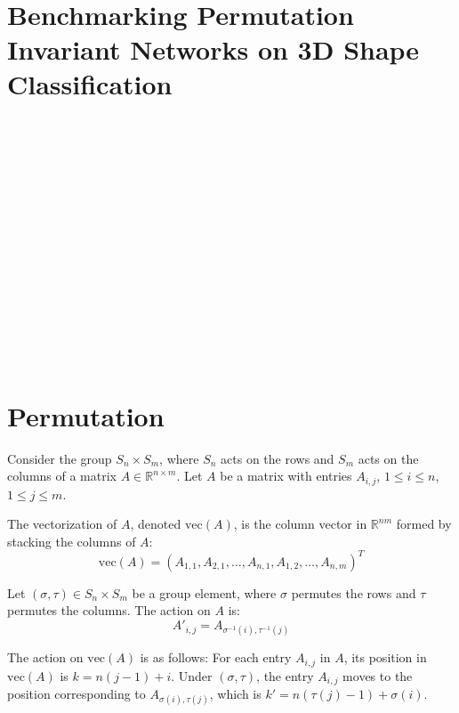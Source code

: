 \documentclass[11pt]{article}
\begin{document}
\subsection{~}

\section{ Benchmarking Permutation Invariant Networks on 3D Shape Classification}

\subsection{~}
\subsection{~}
\subsection{~}
\subsection{~}
\subsection{~}


\section{Permutation}

Consider the group $S_n \times S_m$, where $S_n$ acts on the rows and $S_m$ acts on the columns of a matrix $A \in \mathbb{R}^{n \times m}$. Let $A$ be a matrix with entries $A_{i,j}$, $1 \leq i \leq n$, $1 \leq j \leq m$.

The vectorization of $A$, denoted $\mathrm{vec}(A)$, is the column vector in $\mathbb{R}^{nm}$ formed by stacking the columns of $A$:
\[
\mathrm{vec}(A) = (A_{1,1}, A_{2,1}, \ldots, A_{n,1}, A_{1,2}, \ldots, A_{n,m})^T
\]

Let $(\sigma, \tau) \in S_n \times S_m$ be a group element, where $\sigma$ permutes the rows and $\tau$ permutes the columns. The action on $A$ is:
\[
A'_{i,j} = A_{\sigma^{-1}(i),\tau^{-1}(j)}
\]

The action on $\mathrm{vec}(A)$ is as follows:
For each entry $A_{i,j}$ in $A$, its position in $\mathrm{vec}(A)$ is $k = n(j-1) + i$.
Under $(\sigma, \tau)$, the entry $A_{i,j}$ moves to the position corresponding to $A_{\sigma(i),\tau(j)}$, which is $k' = n(\tau(j)-1) + \sigma(i)$.
\end{document}
